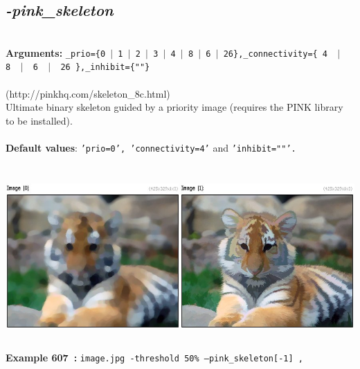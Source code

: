 \documentclass[a4paper,11pt,twoside]{book}
\begin{document}
\subsection{\emph{-pink\_skeleton} }\vspace*{-0.5em}
~\\\textbf{Arguments: } 
{\small \texttt{\_prio=\{0~$|$~1~$|$~2~$|$~3~$|$~4~$|$~8~$|$~6~$|$~26\},\_connectivity=\{ 4 ~$|$~ 8 ~$|$~ 6 ~$|$~ 26 \},\_inhibit=\{""\}}}\\~\\
(http://pinkhq.com/skeleton\_8c.html)
~\\Ultimate binary skeleton guided by a priority image (requires the PINK library to be installed).
~\\~\\\textbf{Default values}: {\small \texttt{'prio=0', 'connectivity=4'} and \texttt{'inhibit=""'.}}
\begin{center}\includegraphics[keepaspectratio=true,height=7cm,width=\textwidth]{img/gmic_def607.jpg}\\
{\footnotesize \textbf{Example 607~:} \texttt{image.jpg -threshold 50\% --pink\_skeleton[-1] ,}}
\end{center}
\end{document}
